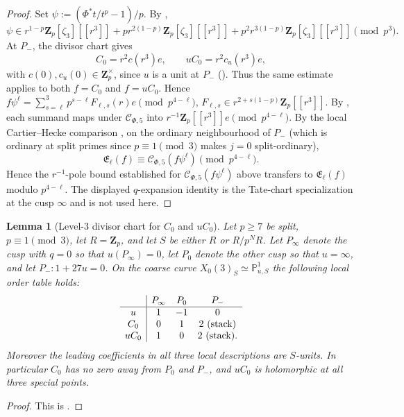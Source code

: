 \documentclass[11pt]{amsart}
\newtheorem{lemma}[theorem]{Lemma}
\theoremstyle{definition}
\theoremstyle{remark}
\newcommand{\Z}{\mathbf{Z}}
\begin{document}
\begin{proof}
Set $\psi:=(\Phi^*t/t^p-1)/p$. By ,
\[
\psi\in r^{1-p}\Z_p[\zeta_3][[r^3]]+pr^{2(1-p)}\Z_p[\zeta_3][[r^3]]+p^2r^{3(1-p)}\Z_p[\zeta_3][[r^3]]\pmod{p^3}.
\]
At $P_-$, the divisor chart gives
\[
C_0=r^2c(r^3)e,\qquad uC_0=r^2c_u(r^3)e,
\]
with $c(0),c_u(0)\in\Z_p^\times$, since $u$ is a unit at $P_-$ (). Thus the same estimate applies to both $f=C_0$ and $f=uC_0$. Hence $f\psi^\ell=\sum_{s=\ell}^3 p^{s-\ell}F_{\ell,s}(r)e\pmod{p^{4-\ell}}$, $F_{\ell,s}\in r^{2+s(1-p)}\Z_p[[r^3]]$. By , each summand maps under $\mathcal C_{\Phi,5}$ into $r^{-1}\Z_p[[r^3]]e\pmod{p^{4-\ell}}$. By the local Cartier--Hecke comparison , on the ordinary neighbourhood of $P_-$ (which is ordinary at split primes since $p\equiv 1\pmod 3$ makes $j=0$ split-ordinary),
\[
\mathfrak E_\ell(f)\equiv \mathcal C_{\Phi,5}(f\psi^\ell)\pmod{p^{4-\ell}}.
\]
Hence the $r^{-1}$-pole bound established for $\mathcal C_{\Phi,5}(f\psi^\ell)$ above transfers to $\mathfrak E_\ell(f)$ modulo $p^{4-\ell}$. The displayed $q$-expansion identity is the Tate-chart specialization at the cusp $\infty$ and is not used here.
\end{proof}

\begin{lemma}[Level-$3$ divisor chart for $C_0$ and $uC_0$]\label{lem:level3-divisor-chart-C0}
Let $p\ge 7$ be split, $p\equiv 1\pmod 3$, let $R=\Z_p$, and let $S$ be either $R$ or $R/p^N R$. Let $P_\infty$ denote the cusp with $q=0$ so that $u(P_\infty)=0$, let $P_0$ denote the other cusp so that $u=\infty$, and let $P_-:1+27u=0$. On the coarse curve $X_0(3)_S\simeq\mathbb P^1_{u,S}$ the following local order table holds:
\[
\begin{array}{c|ccc}
& P_\infty & P_0 & P_- \\ \hline
u & 1 & -1 & 0\\
C_0 & 0 & 1 & 2\ \text{\rm(stack)}\\
uC_0 & 1 & 0 & 2\ \text{\rm(stack)}.
\end{array}
\]
Moreover the leading coefficients in all three local descriptions are $S$-units. In particular $C_0$ has no zero away from $P_0$ and $P_-$, and $uC_0$ is holomorphic at all three special points.
\end{lemma}

\begin{proof}
This is .
\end{proof}
\end{document}
